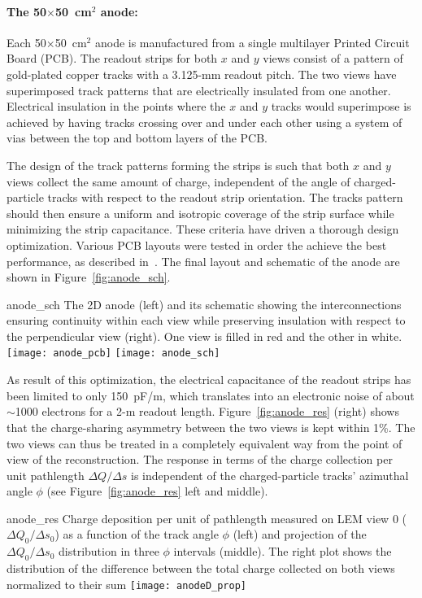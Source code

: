  \paragraph{The 50$\times$50~cm$^2$ anode:}

Each  50$\times$50~cm$^2$ anode is manufactured from a single multilayer Printed Circuit
Board (PCB). The readout strips for both $x$ and $y$ views consist of a pattern of
gold-plated copper tracks 
with a 3.125-mm readout pitch. The two views have superimposed track patterns
that are  electrically insulated from one another. Electrical insulation in the points where
the $x$ and $y$ tracks would superimpose is achieved by having tracks crossing
over and under each other using a system of vias between the top and bottom layers of the PCB.
 
The design of the track patterns forming the strips is such that both $x$ and $y$ views
collect the same amount of charge, independent of the angle of
charged-particle tracks with respect to the readout strip
orientation. The tracks pattern should then ensure a uniform and isotropic coverage of the strip surface while 
minimizing the strip capacitance. These criteria have driven a thorough design optimization.  
Various PCB layouts were tested in order the achieve the best performance, as described in~\cite{Cantini:2013yba}. 
The final layout and schematic of the anode are shown in Figure~\ref{fig:anode_sch}. 

\begin{cdrfigure}{anode_sch}
{The 2D anode (left) and its schematic showing the  interconnections  ensuring continuity within each view while preserving insulation
with respect to the perpendicular view  (right). One view is filled  in red and the other in white.}
\texttt{[image: anode\_pcb]} \hspace{0.2cm} \texttt{[image: anode\_sch]}
\end{cdrfigure}

As result of this optimization, the electrical capacitance of the
readout strips has been limited to only 150~pF/m, which translates
into an electronic noise of about $\sim$1000 electrons for a 2-m readout
length.  Figure~\ref{fig:anode_res} (right) shows that the
charge-sharing asymmetry between the two views is kept within 1\%. 
The two views can thus be treated in a completely equivalent way
from the point of view of the reconstruction. The response in terms of
the charge collection per unit pathlength $\Delta Q/\Delta s$ is
independent of the charged-particle tracks' azimuthal angle $\phi$
(see Figure~\ref{fig:anode_res} left and middle).
\begin{cdrfigure}{anode_res} {Charge deposition per unit of pathlength measured on LEM view 0 
($\Delta Q_0/\Delta s_0$) as a function  of the track angle $\phi$ (left) and  projection of the  $\Delta Q_0/\Delta s_0$ distribution in three $\phi$ intervals (middle).  The right plot  shows the distribution of the difference between the total charge  collected on both views normalized to their sum}
\texttt{[image: anodeD\_prop]}
\end{cdrfigure}

